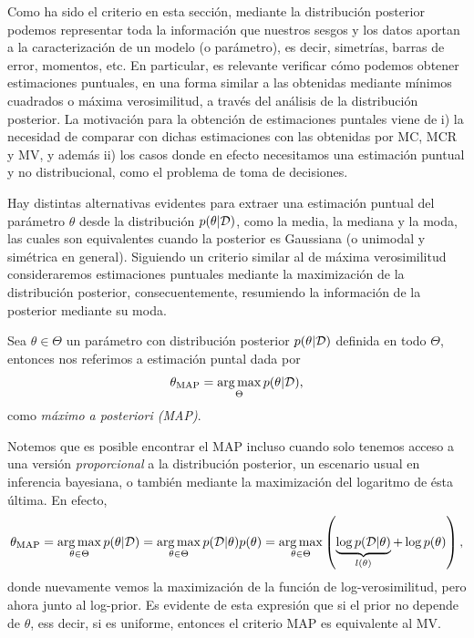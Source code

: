 Como ha sido el criterio en esta sección, mediante la distribución posterior podemos representar toda la información que nuestros sesgos y los datos aportan a la caracterización de un modelo (o parámetro), es decir, simetrías, barras de error, momentos, etc. En particular, es relevante verificar cómo podemos obtener estimaciones puntuales, en una forma similar a las obtenidas mediante mínimos cuadrados o máxima verosimilitud, a través del análisis de la distribución posterior. La motivación para la obtención de estimaciones puntales viene de i) la necesidad de comparar con dichas estimaciones con las obtenidas por MC, MCR y MV, y además ii) los casos donde en efecto necesitamos una estimación puntual y no distribucional, como el problema de toma de decisiones.

Hay distintas alternativas evidentes para extraer una estimación puntual del parámetro $\theta$ desde la distribución $p(\theta|{\mathcal D})$, como la media, la mediana y la moda, las cuales son equivalentes cuando la posterior es  Gaussiana (o unimodal y simétrica en general). Siguiendo un criterio similar al de máxima verosimilitud consideraremos estimaciones puntuales mediante la maximización de la distribución posterior, consecuentemente, resumiendo la información de la posterior mediante su moda. 

\begin{definition}
Sea $\theta\in\Theta$ un parámetro con distribución posterior $p(\theta|{\mathcal D})$ definida en todo $\Theta$, entonces nos referimos a estimación puntal dada por
\begin{equation}
	\theta_\text{MAP} = \operatorname*{arg\,max}_{\Theta}p(\theta|{\mathcal D}),
\end{equation}
como \emph{máximo a posteriori (MAP)}.

\end{definition}

Notemos que es posible encontrar el MAP incluso cuando solo tenemos acceso a una versión \emph{proporcional} a la distribución posterior, un escenario usual en inferencia bayesiana, o también mediante la maximización del logaritmo de ésta última. En efecto, 
\begin{equation}
	\theta_\text{MAP} = \operatorname*{arg\,max}_{\theta\in\Theta}p(\theta|{\mathcal D}) = \operatorname*{arg\,max}_{\theta\in\Theta}p({\mathcal D}|\theta)p(\theta)= \operatorname*{arg\,max}_{\theta\in\Theta}\left(\underbrace{\log p({\mathcal D}|\theta)}_{l(\theta)} + \log p(\theta)\right),
\end{equation}
donde  nuevamente vemos la maximización de  la función de log-verosimilitud, pero ahora junto al log-prior. Es evidente de esta expresión que si el prior no depende de $\theta$, ess decir, si es uniforme, entonces el criterio MAP es equivalente al MV.

